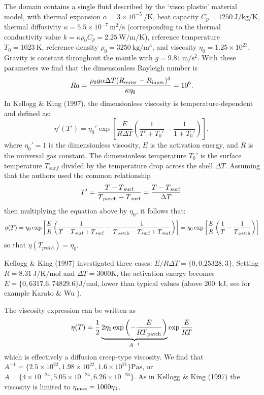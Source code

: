 The domain contains a single fluid described by the `visco plastic' material model, with thermal expansion $\alpha=3\times 10^{-5}~\si{\per\kelvin}$, heat capacity $C_p=1250~\si{\joule\per\kg\per\kelvin}$, thermal diffusivity $\kappa=5.5\times 10^{-7}~\si{\square\meter\per\second}$ (corresponding to the thermal conductivity value  $k=\kappa \rho_0 C_p=2.25~\si{\watt\per\meter\per\kelvin}$), reference temperature $T_0=1023~\si{\kelvin}$, reference density  $\rho_0=3250~\si{\kg\per\cubic\meter}$, and viscosity $\eta_0=1.25\times 10^{23}$. Gravity is constant throughout the mantle with $g=9.81~\si{\meter\per\square\second}$.
With these parameters we find that the dimensionless Rayleigh number is 
\begin{equation}
Ra 
=\frac{\rho_0 g \alpha \Delta T (R\textsubscript{outer}-R\textsubscript{inner})^3}{\kappa \eta_0}
=10^6.
\end{equation}
In Kellogg \& King (1997), the dimensionless viscosity is temperature-dependent and defined as:
\[
\eta'(T')
=\eta_0' \exp\left[ \frac{E}{R \Delta T} \left( \frac{1}{T'+T_0'} -\frac{1}{1+T_0'}  \right)   \right],
\]
where $\eta_0'=1$ is the dimensionless viscosity, $E$ is the activation energy, and $R$ is the universal gas constant. The dimensionless temperature $T_0'$ is the surface temperature $T_{surf}$ divided by the temperature drop across the shell $\Delta T$. 
Assuming that the authors used the common relationship	 
\[
T'=\frac{T-T\textsubscript{surf}}{T\textsubscript{patch}-T\textsubscript{surf}}= \frac{T-T\textsubscript{surf}}{\Delta T}.
\]
then multiplying the equation above by $\eta_0$, it follows that:
\[
\eta(T)
=\eta_0 \exp\left[ \frac{E}{R} \left( \frac{1}{T-T\textsubscript{surf}  + T\textsubscript{surf}} 
-\frac{1}{T\textsubscript{patch}-T\textsubscript{surf} + T\textsubscript{surf}}  \right)   \right]
=\eta_0 \exp\left[ \frac{E}{R} \left( \frac{1}{T} -\frac{1}{T\textsubscript{patch}}\right) \right]
\]
so that $\eta(T_{patch})=\eta_0$.

Kellogg \& King (1997) investigated three cases:
$E/R \Delta T = \{0,0.25328,3\}$. Setting $R=8.31~\si{\joule\per\kelvin\per\mol}$ and $\Delta T=3000\si{\kelvin}$, the activation energy becomes $E=\{ 0, 6317.6 , 74829.6 \}\si{\joule\per\mole}$, lower than typical values (above 200~\si{kJ}, see for example Karato \& Wu \cite{KW93}).

The viscosity expression can be written as
\[
\eta(T)  
= \frac12 \underbrace{2 \eta_0  \exp\left( -\frac{E}{R T\textsubscript{patch}} \right) }_{A^{-1}} \exp \frac{E}{R T}  
\]
which is effectively a diffusion creep-type viscosity.
We find that $A^{-1} = \{ 2.5\times 10^{22}, 1.98\times 10^{22} , 1.6\times 10^{21} \}\si{\pascal\second}$, or  $A = \{ 4\times 10^{-24}, 5.05\times 10^{-24},  6.26\times 10^{-23}\} $. As in Kellogg \& King (1997) the viscosity is limited to  $\eta\textsubscript{max}=1000\eta_0$. 

